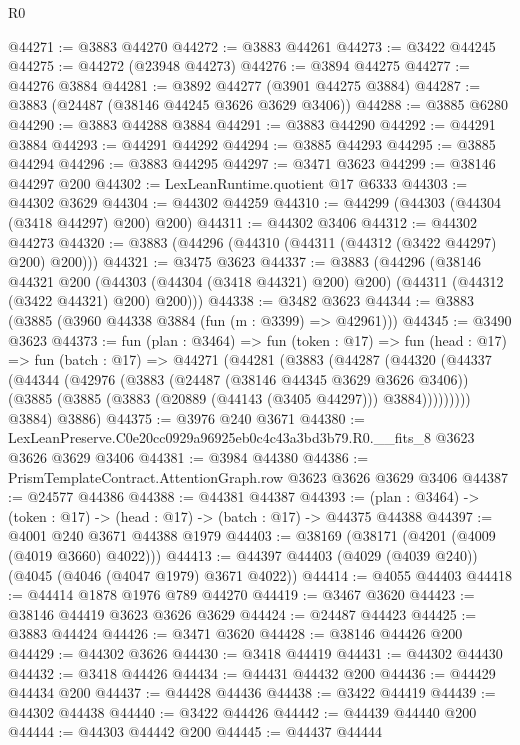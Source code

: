 \begin{lexlean}{R0}
\begin{coremodule}
@44271 := @3883 @44270
@44272 := @3883 @44261
@44273 := @3422 @44245
@44275 := @44272 (@23948 @44273)
@44276 := @3894 @44275
@44277 := @44276 @3884
@44281 := @3892 @44277 (@3901 @44275 @3884)
@44287 := @3883 (@24487 (@38146 @44245 @3626 @3629 @3406))
@44288 := @3885 @6280
@44290 := @3883 @44288 @3884
@44291 := @3883 @44290
@44292 := @44291 @3884
@44293 := @44291 @44292
@44294 := @3885 @44293
@44295 := @3885 @44294
@44296 := @3883 @44295
@44297 := @3471 @3623
@44299 := @38146 @44297 @200
@44302 := LexLeanRuntime.quotient @17 @6333
@44303 := @44302 @3629
@44304 := @44302 @44259
@44310 := @44299 (@44303 (@44304 (@3418 @44297) @200) @200)
@44311 := @44302 @3406
@44312 := @44302 @44273
@44320 := @3883 (@44296 (@44310 (@44311 (@44312 (@3422 @44297) @200) @200)))
@44321 := @3475 @3623
@44337 := @3883
    (@44296
      (@38146
        @44321
        @200
        (@44303 (@44304 (@3418 @44321) @200) @200)
        (@44311 (@44312 (@3422 @44321) @200) @200)))
@44338 := @3482 @3623
@44344 := @3883 (@3885 (@3960 @44338 @3884 (fun (m : @3399) => @42961)))
@44345 := @3490 @3623
@44373 := fun (plan : @3464) =>
  fun (token : @17) =>
  fun (head : @17) =>
  fun (batch : @17) =>
  @44271
    (@44281
      (@3883
        (@44287
          (@44320
            (@44337
              (@44344
                (@42976
                  (@3883
                    (@24487 (@38146 @44345 @3629 @3626 @3406))
                    (@3885 (@3885 (@3883 (@20889 (@44143 (@3405 @44297))) @3884)))))))))
        @3884)
      @3886)
@44375 := @3976 @240 @3671
@44380 := LexLeanPreserve.C0e20cc0929a96925eb0c4c43a3bd3b79.R0.__fits_8 @3623 @3626 @3629 @3406
@44381 := @3984 @44380
@44386 := PrismTemplateContract.AttentionGraph.row @3623 @3626 @3629 @3406
@44387 := @24577 @44386
@44388 := @44381 @44387
@44393 := (plan : @3464) -> (token : @17) -> (head : @17) -> (batch : @17) -> @44375 @44388
@44397 := @4001 @240 @3671 @44388 @1979
@44403 := @38169 (@38171 (@4201 (@4009 (@4019 @3660) @4022)))
@44413 := @44397 @44403 (@4029 (@4039 @240)) (@4045 (@4046 (@4047 @1979) @3671 @4022))
@44414 := @4055 @44403
@44418 := @44414 @1878 @1976 @789 @44270
@44419 := @3467 @3620
@44423 := @38146 @44419 @3623 @3626 @3629
@44424 := @24487 @44423
@44425 := @3883 @44424
@44426 := @3471 @3620
@44428 := @38146 @44426 @200
@44429 := @44302 @3626
@44430 := @3418 @44419
@44431 := @44302 @44430
@44432 := @3418 @44426
@44434 := @44431 @44432 @200
@44436 := @44429 @44434 @200
@44437 := @44428 @44436
@44438 := @3422 @44419
@44439 := @44302 @44438
@44440 := @3422 @44426
@44442 := @44439 @44440 @200
@44444 := @44303 @44442 @200
@44445 := @44437 @44444

\end{coremodule}
\end{lexlean}
